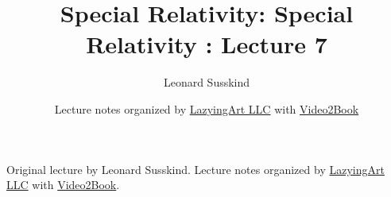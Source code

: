 \documentclass[11pt,oneside]{book}
\begin{document}
\frontmatter
\title{Special Relativity: Special Relativity : Lecture 7}
\author{Leonard Susskind}
\date{Lecture notes organized by \href{https://lazying.art}{LazyingArt LLC} with \href{https://github.com/lachlanchen/Video2Book}{Video2Book}}
\maketitle
\begin{center}
\small Original lecture by Leonard Susskind. Lecture notes organized by \href{https://lazying.art}{LazyingArt LLC} with \href{https://github.com/lachlanchen/Video2Book}{Video2Book}.
\end{center}
\clearpage
\mainmatter

\end{document}
